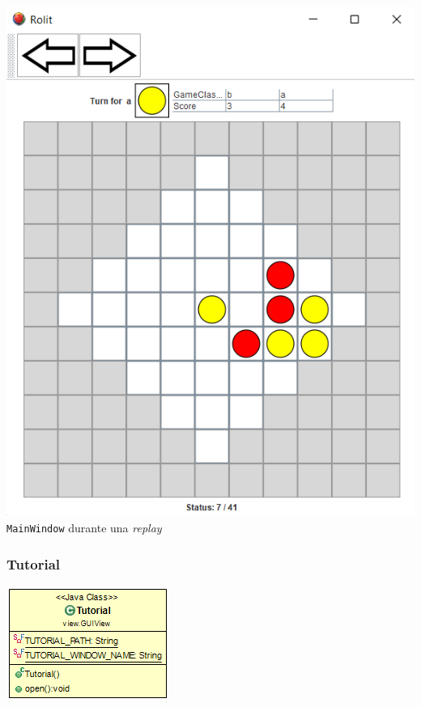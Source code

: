 \documentclass[../DocumentoOficial.tex]{subfiles}
\begin{document}
\begin{center}
\includegraphics[scale=0.7]{replay-sprint-6.png}\\
\texttt{MainWindow} durante una \textit{replay}
\end{center}

\subsubsection{Tutorial}

\begin{center}
\includegraphics[scale=0.9]{Tutorial-sprint7.png}\\
\end{center}
\end{document}
